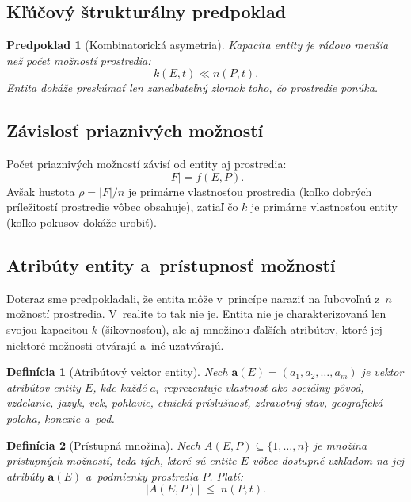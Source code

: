 \documentclass[12pt,a4paper]{article}
\newtheorem{definition}{Definícia}[section]
\newtheorem{assumption}{Predpoklad}[section]
\begin{document}
\subsection{Kľúčový štrukturálny predpoklad}

\begin{assumption}[Kombinatorická asymetria]\label{asp:asymetria}
Kapacita entity je rádovo menšia než počet možností prostredia:
\begin{equation}
    k(E, t) \ll n(P, t).
\end{equation}
Entita dokáže preskúmať len zanedbateľný zlomok toho, čo prostredie ponúka.
\end{assumption}

\subsection{Závislosť priaznivých možností}

Počet priaznivých možností závisí od entity aj prostredia:
\begin{equation}
    |F| = f(E, P).
\end{equation}
Avšak hustota $\rho = |F|/n$ je primárne vlastnosťou prostredia (koľko dobrých príležitostí prostredie vôbec obsahuje), zatiaľ čo $k$ je primárne vlastnosťou entity (koľko pokusov dokáže urobiť).

\subsection{Atribúty entity a~prístupnosť možností}

Doteraz sme predpokladali, že entita môže v~princípe naraziť na ľubovoľnú z~$n$ možností prostredia. V~realite to tak nie je. Entita nie je charakterizovaná len svojou kapacitou $k$ (šikovnosťou), ale aj množinou ďalších atribútov, ktoré jej niektoré možnosti otvárajú a~iné uzatvárajú.

\begin{definition}[Atribútový vektor entity]
Nech $\mathbf{a}(E) = (a_1, a_2, \dots, a_m)$ je vektor atribútov entity $E$, kde každé $a_i$ reprezentuje vlastnosť ako sociálny pôvod, vzdelanie, jazyk, vek, pohlavie, etnická príslušnosť, zdravotný stav, geografická poloha, konexie a~pod.
\end{definition}

\begin{definition}[Prístupná množina]
Nech $A(E, P) \subseteq \{1, \dots, n\}$ je množina \emph{prístupných možností}, teda tých, ktoré sú entite $E$ vôbec dostupné vzhľadom na jej atribúty $\mathbf{a}(E)$ a~podmienky prostredia $P$. Platí:
\begin{equation}
    |A(E, P)| \;\leq\; n(P, t).
\end{equation}
\end{definition}
\end{document}
